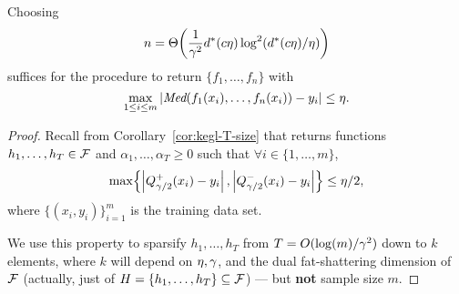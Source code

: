 \begin{theorem}
\label{thm:real-sparsification}
Choosing $$n = \Theta\!\left( \frac{1}{\gamma^{2}} d^{*}(c\eta) \log^{2}( d^{*}(c\eta)/\eta ) \right)$$ 
suffices for the  procedure to return $\{f_{1},\ldots,f_{n}\}$ 
with $$\max_{1 \leq i \leq m} | \emph{Med}(f_{1}(x_{i}),\ldots,f_{n}(x_{i})) - y_{i} | \leq \eta.$$
\end{theorem}
\begin{proof}
%
%
Recall from Corollary~\ref{cor:kegl-T-size} that 
 returns functions $h_{1},\ldots,h_{T} \in \mathcal{F}$ and $\alpha_{1},\ldots,\alpha_{T} \geq 0$ 
such that $\forall i \in \{1,\ldots,m\}$, 
\begin{equation*}
\max\!\left\{ \left| Q_{\gamma/2}^{+}(x_{i}) - y_{i} \right|, \left| Q_{\gamma/2}^{-}(x_{i}) - y_{i} \right| \right\} \leq \eta/2,
\end{equation*}
where $\{(x_{i},y_{i})\}_{i=1}^{m}$ is the training data set.

We use this %
property to sparsify $h_{1},\ldots,h_{T}$ from $T=O(\log(m)/\gamma^2)$
down to $k$
elements, where $k$ will depend on $\eta,\gamma$, and
the dual fat-shattering
dimension of $\mathcal{F}$
(actually, just of $H = \{h_{1},\ldots,h_{T}\}\subseteq\mathcal{F}$)
--- but {\bf not} sample size $m$.


\end{proof}
